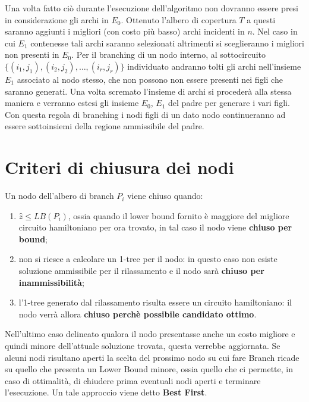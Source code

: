\documentclass[
    article,            %
    12pt,                %
    oneside,            %
    a4paper,            %
    english,            %
    italian,                %
    sumario=tradicional,
]{abntex2}
\begin{document}
    Una volta fatto ciò durante l'esecuzione dell'algoritmo non dovranno essere presi in considerazione gli archi in $E_0$.
    Ottenuto l'albero di copertura $T$ a questi saranno aggiunti i migliori (con costo più basso) archi incidenti in $n$.
    Nel caso in cui $E_1$ contenesse tali archi saranno selezionati altrimenti si sceglieranno i migliori non presenti in $E_0$.
    \newline
    Per il branching di un nodo interno, al sottocircuito $\{(i_1, j_1), (i_2,j_2),\dots,(i_r,j_r)\}$ individuato andranno tolti gli archi nell'insieme $E_1$ associato al nodo stesso, che non possono non essere presenti nei figli che saranno generati.
    Una volta scremato l'insieme di archi si procederà alla stessa maniera e verranno estesi gli insieme $E_0$, $E_1$ del padre per generare i vari figli.
    \newline
    Con questa regola di branching i nodi figli di un dato nodo continueranno ad essere sottoinsiemi della regione ammissibile del padre.


    \section{Criteri di chiusura dei nodi}\label{sec:criteri-di-chiusura-dei-nodi}
    Un nodo dell'albero di branch $P_i$ viene chiuso quando:
    \begin{enumerate}
        \item $\hat{z} \leq LB(P_i)$, ossia quando il lower bound fornito è maggiore del migliore circuito hamiltoniano per ora trovato, in tal caso il nodo viene \textbf{chiuso per bound};
        \item non si riesce a calcolare un 1-tree per il nodo: in questo caso non esiste soluzione ammissibile per il rilassamento e il nodo sarà \textbf{chiuso per inammissibilità};
        \item l'1-tree generato dal rilassamento risulta essere un circuito hamiltoniano: il nodo verrà allora \textbf{chiuso perchè possibile candidato ottimo}.
    \end{enumerate}
    Nell'ultimo caso delineato qualora il nodo presentasse anche un costo migliore e quindi minore dell'attuale soluzione trovata, questa verrebbe aggiornata.
    \newline
    Se alcuni nodi risultano aperti la scelta del prossimo nodo su cui fare Branch ricade su quello che presenta un Lower Bound minore, ossia quello che ci permette, in caso di ottimalità, di chiudere prima eventuali nodi aperti e terminare l'esecuzione.
    Un tale approccio viene detto \textbf{Best First}.
\end{document}
